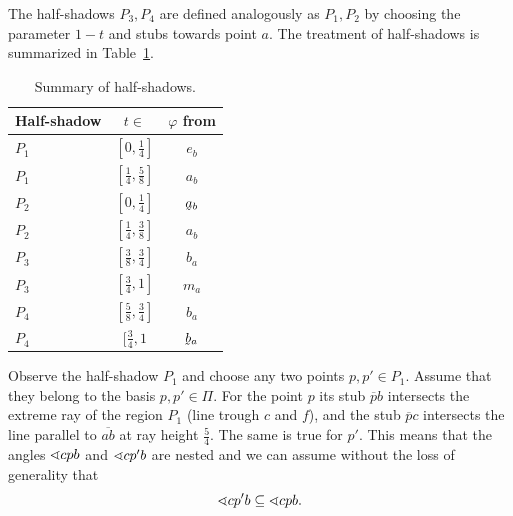 The half-shadows $P_{3}, P_{4}$ are defined analogously as $P_{1}, P_{2}$ by choosing the parameter $1 - t$ and stubs towards point $a$. The treatment of half-shadows is summarized in Table~\ref{tab: half-shadows-description}.

\begin{table}
\begin{center}
\begin{tabular}{lcc}
	\toprule[1.5pt]
    Half-shadow & $t \in $ & $\varphi$ from \\
	\midrule[1.5pt]
	$P_{1}$  & $[0,\frac{1}{4}]$ & $e_{b}$\\[0.2cm]
	$P_{1}$  & $[\frac{1}{4},\frac{5}{8}]$& $a_{b}$ \\[0.2cm]

	$P_{2}$  & $[0,\frac{1}{4}]$& $\undersym{a}_{b}$ \\[0.2cm]
	$P_{2}$ & $[\frac{1}{4},\frac{3}{8}]$ & $a_{b}$ \\[0.2cm]

	$P_{3}$ & $[\frac{3}{8},\frac{3}{4}]$ & $b_{a}$ \\[0.2cm]
	$P_{3}$ & $[\frac{3}{4},1]$ & $m_{a}$ \\[0.2cm]

	$P_{4}$ & $[\frac{5}{8},\frac{3}{4}]$ & $b_{a}$ \\[0.2cm]
	$P_{4}$ & $[\frac{3}{4},1$ & $\undersym{b}_{a}$ \\[0.2cm]
	\bottomrule[1.5pt]
\end{tabular}
\end{center}
\caption{Summary of half-shadows.}
\label{tab: half-shadows-description}
\end{table}

Observe the half-shadow $P_{1}$ and choose any two points $p,p' \in P_{1}$. Assume that they belong to the basis $p,p' \in \Pi$. For the point $p$ its stub $\overline{p}b$ intersects the extreme ray of the region $P_{1}$ (line trough $c$ and $f$), and the stub $\overline{p}c$ intersects the line parallel to $\overline{ab}$ at ray height $\frac{5}{4}$. The same is true for $p'$. This means that the angles $\sphericalangle{cpb}$ and $\sphericalangle{cp'b}$ are nested and we can assume without the loss of generality that
$$
\sphericalangle{cp'b} \subseteq \sphericalangle{cpb}.
$$

